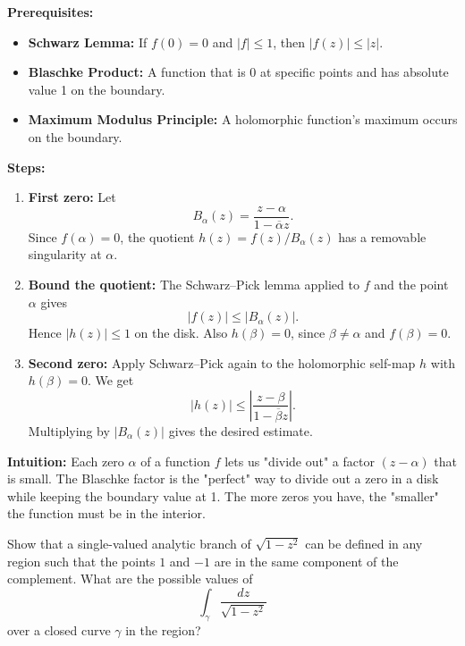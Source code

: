 \begin{solution}
\textbf{Prerequisites:}
\begin{itemize}
    \item \textbf{Schwarz Lemma:} If $f(0)=0$ and $|f| \leq 1$, then $|f(z)| \leq |z|$.
    \item \textbf{Blaschke Product:} A function that is 0 at specific points and has absolute value 1 on the boundary.
    \item \textbf{Maximum Modulus Principle:} A holomorphic function's maximum occurs on the boundary.
\end{itemize}

\textbf{Steps:}
\begin{enumerate}
    \item \textbf{First zero:} Let
    \[
    B_\alpha(z)=\frac{z-\alpha}{1-\overline{\alpha}z}.
    \]
    Since $f(\alpha)=0$, the quotient $h(z)=f(z)/B_\alpha(z)$ has a removable singularity at $\alpha$.
    \item \textbf{Bound the quotient:} The Schwarz--Pick lemma applied to $f$ and the point $\alpha$ gives
    \[
    |f(z)|\leq |B_\alpha(z)|.
    \]
    Hence $|h(z)|\leq1$ on the disk. Also $h(\beta)=0$, since $\beta\neq\alpha$ and $f(\beta)=0$.
    \item \textbf{Second zero:} Apply Schwarz--Pick again to the holomorphic self-map $h$ with $h(\beta)=0$. We get
    \[
    |h(z)|\leq
    \left|\frac{z-\beta}{1-\overline{\beta}z}\right|.
    \]
    Multiplying by $|B_\alpha(z)|$ gives the desired estimate.
\end{enumerate}

\textbf{Intuition:}
Each zero $\alpha$ of a function $f$ lets us "divide out" a factor $(z-\alpha)$ that is small. The Blaschke factor is the "perfect" way to divide out a zero in a disk while keeping the boundary value at 1. The more zeros you have, the "smaller" the function must be in the interior.
\end{solution}

\begin{exercise}
\label{analysis:2017:10}
Show that a single-valued analytic branch of $\sqrt{1-z^2}$ can be defined in any region such that the points $1$ and $-1$ are in the same component of the complement. What are the possible values of
\[
\int_\gamma \frac{dz}{\sqrt{1-z^2}}
\]
over a closed curve $\gamma$ in the region?
\end{exercise}

